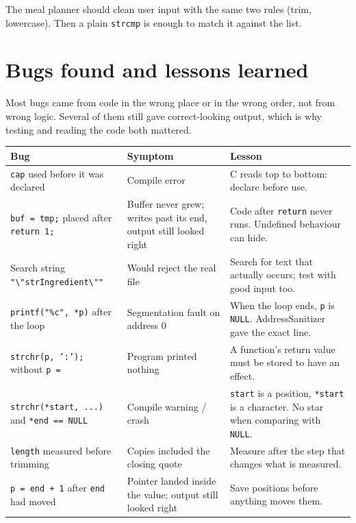 \documentclass[11pt,a4paper]{article}
\newcommand{\code}[1]{\texttt{#1}}
\begin{document}
The meal planner should clean user input with the same two rules (trim,
lowercase). Then a plain \code{strcmp} is enough to match it against the list.

\section{Bugs found and lessons learned}

Most bugs came from code in the wrong place or in the wrong order, not from
wrong logic. Several of them still gave correct-looking output, which is why
testing and reading the code both mattered.

\begin{center}
\small
\begin{tabularx}{\textwidth}{@{}>{\raggedright\arraybackslash}p{} L L@{}}
\toprule
\textbf{Bug} & \textbf{Symptom} & \textbf{Lesson} \\
\midrule
\code{cap} used before it was declared
  & Compile error
  & C reads top to bottom: declare before use. \\
\code{buf = tmp;} placed after \code{return 1;}
  & Buffer never grew; writes past its end, output still looked right
  & Code after \code{return} never runs. Undefined behaviour can hide. \\
Search string \code{"\textbackslash"strIngredient\textbackslash""}
  & Would reject the real file
  & Search for text that actually occurs; test with good input too. \\
\code{printf("\%c", *p)} after the loop
  & Segmentation fault on address 0
  & When the loop ends, \code{p} is \code{NULL}. AddressSanitizer gave the
    exact line. \\
\code{strchr(p, ':');} without \code{p =}
  & Program printed nothing
  & A function's return value must be stored to have an effect. \\
\code{strchr(*start, ...)} and \code{*end == NULL}
  & Compile warning / crash
  & \code{start} is a position, \code{*start} is a character. No star when
    comparing with \code{NULL}. \\
\code{length} measured before trimming
  & Copies included the closing quote
  & Measure after the step that changes what is measured. \\
\code{p = end + 1} after \code{end} had moved
  & Pointer landed inside the value; output still looked right
  & Save positions before anything moves them. \\

\end{tabularx}
\end{center}
\end{document}
